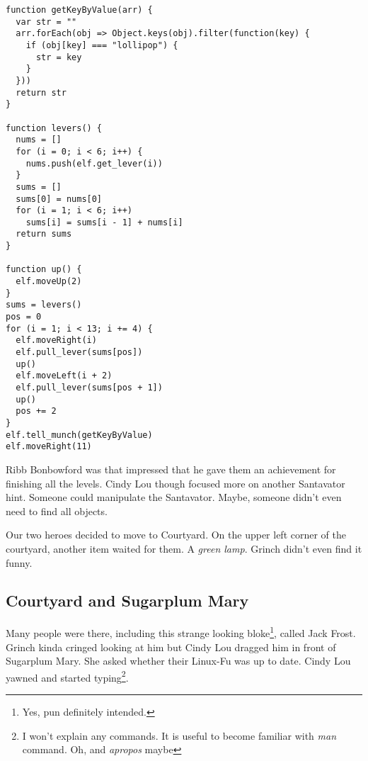 \begin{verbatim}
function getKeyByValue(arr) {
  var str = ""
  arr.forEach(obj => Object.keys(obj).filter(function(key) {
    if (obj[key] === "lollipop") {
      str = key
    }
  }))
  return str
}

function levers() {
  nums = []
  for (i = 0; i < 6; i++) {
    nums.push(elf.get_lever(i))
  }
  sums = []
  sums[0] = nums[0]
  for (i = 1; i < 6; i++)
    sums[i] = sums[i - 1] + nums[i]
  return sums
}

function up() {
  elf.moveUp(2)
}
sums = levers()
pos = 0
for (i = 1; i < 13; i += 4) {
  elf.moveRight(i)
  elf.pull_lever(sums[pos])
  up()
  elf.moveLeft(i + 2)
  elf.pull_lever(sums[pos + 1])
  up()
  pos += 2
}
elf.tell_munch(getKeyByValue)
elf.moveRight(11)
\end{verbatim}

{\color{codegreen}Ribb Bonbowford} was that impressed that he gave them an achievement for finishing all the levels. Cindy Lou though focused more on another Santavator hint. Someone could manipulate the Santavator. Maybe, someone didn't even need to find all objects.

Our two heroes decided to move to Courtyard. On the upper left corner of the courtyard, another item waited for them. A \textit{green lamp}. Grinch didn't even find it funny.

\subsection{Courtyard and Sugarplum Mary}
Many people were there, including this strange looking bloke\footnote{Yes, pun definitely intended.}, called {\color{codegreen}Jack Frost}. Grinch kinda cringed looking at him but Cindy Lou dragged him in front of {\color{codegreen}Sugarplum Mary}. She asked whether their Linux-Fu was up to date. Cindy Lou yawned and started typing\footnote{I won't explain any commands. It is useful to become familiar with \textit{man} command. Oh, and \textit{apropos} maybe}.

